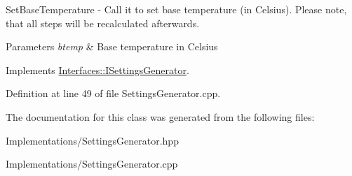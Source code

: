 Set\+Base\+Temperature -\/ Call it to set base temperature (in Celsius). Please note, that all steps will be recalculated afterwards. 


\begin{DoxyParams}{Parameters}
{\em btemp} & Base temperature in Celsius \\
\hline
\end{DoxyParams}


Implements \hyperlink{class_interfaces_1_1_i_settings_generator_a8b60ba05790994db0303b251f655e95d}{Interfaces\+::\+I\+Settings\+Generator}.



Definition at line 49 of file Settings\+Generator.\+cpp.



The documentation for this class was generated from the following files\+:\begin{DoxyCompactItemize}
\item 
Implementations/Settings\+Generator.\+hpp\item 
Implementations/Settings\+Generator.\+cpp\end{DoxyCompactItemize}
